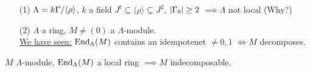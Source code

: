 \begin{note}
\begin{enumerate}
\item[(1)] $\Lambda = k\Gamma / \langle \rho \rangle$, $k$ a field $J^t \subseteq \langle \rho \rangle \subseteq J^2$, $|\Gamma_0| \geq 2$ $\implies \Lambda$ not local (Why?)
\item[(2)] $\Lambda$ a ring, $M \neq (0)$ a $\Lambda$-module.\\
\underline{We have seen:} $\operatorname{End}_\Lambda(M)$ contains an idempotenet $\neq 0,1$ $\iff M$ decomposes.
\end{enumerate}
\end{note}


\begin{cor}
\label{cor:local_imply_indec}
$M$ $\Lambda$-module, $\operatorname{End}_\Lambda(M)$ a local ring $\implies M$ indecomposable.
\end{cor}

